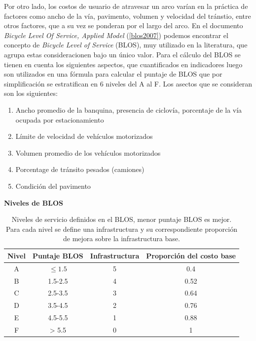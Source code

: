 \documentclass{article}
\begin{document}
  Por otro lado, los costos de usuario de atravesar un arco varían en la práctica de factores como ancho de la vía, pavimento, volumen y velocidad del tránstio, entre otros factores, que a su vez se ponderan por el largo del arco. En el documento {\it Bicycle Level Of Service, Applied Model} (\ref{blos2007}) podemos encontrar el concepto de {\it Bicycle Level of Service} (BLOS), muy utilizado en la literatura, que agrupa estas consideracionen bajo un único valor. Para el cálculo del BLOS se tienen en cuenta los siguientes aspectos, que cuantificados en indicadores luego son utilizados en una fórmula para calcular el puntaje de BLOS que por simplificación se estratifican en 6 niveles del A al F. Los asectos que se consideran son los siguientes:

  \begin{enumerate}
    \item{Ancho promedio de la banquina, presencia de ciclovía, porcentaje de la vía ocupada por estacionamiento}
    \item{Límite de velocidad de vehículos motorizados}
    \item{Volumen promedio de los vehículos motorizados}
    \item{Porcentage de tránsito pesados (camiones)}
    \item{Condición del pavimento}
  \end{enumerate}

  \begin{table}[h!]
    \centering
    \caption*{{\bf Niveles de BLOS}}
    \begin{tabular}{cccc}
      \toprule
        Nivel & Puntaje BLOS & Infrastructura & Proporción del costo base \\
      \midrule
        A     & $\leq 1.5$   & 5              & 0.4   \\
        B     & 1.5-2.5      & 4              & 0.52  \\
        C     & 2.5-3.5      & 3              & 0.64  \\
        D     & 3.5-4.5      & 2              & 0.76  \\
        E     & 4.5-5.5      & 1              & 0.88  \\
        F     & > 5.5        & 0              & 1     \\
      \bottomrule
    \end{tabular}
    \caption{Niveles de servicio definidos en el BLOS, menor puntaje BLOS es mejor. Para cada nivel se define una infrastructura y su correspondiente proporción de mejora sobre la infrastructura base.}\label{table:blosscores}
  \end{table}
\end{document}
